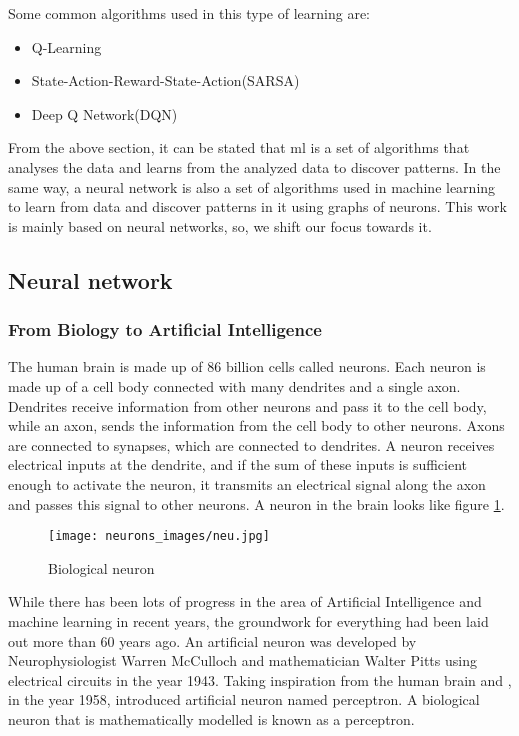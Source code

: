 \par

Some common algorithms used in this type of learning are: 

\begin{itemize}
        \item Q-Learning
        \item State-Action-Reward-State-Action(SARSA)
        \item Deep Q Network(DQN)
\end{itemize}


From the above section, it can be stated that \ac{ml} is a set of algorithms that analyses the data and learns from the analyzed data to discover patterns. In the same way, a neural network is also a set of algorithms used in machine learning to learn from data and discover patterns in it using graphs of neurons. This work is mainly based on neural networks, so,  we shift our focus towards it. 

\subsection{Neural network} \label{Neural Networks}

\subsubsection{From Biology to Artificial Intelligence}

The human brain is made up of 86 billion cells called neurons. Each neuron is made up of a cell body connected with many dendrites and a single axon. Dendrites receive information from other neurons and pass it to the cell body, while an axon, sends the information from the cell body to other neurons. Axons are connected to synapses, which are connected to dendrites. A neuron receives electrical inputs at the dendrite, and if the sum of these inputs is sufficient enough to activate the neuron, it transmits an electrical signal along the axon and passes this signal to other neurons. A neuron in the brain looks like figure \ref{biological_neuron}.  

\begin{figure}[h!]
    \centering
    \texttt{[image: neurons\_images/neu.jpg]}
    \caption{Biological neuron \cite{cs231}}
    \label{biological_neuron}
\end{figure}

\newpage

While there has been lots of progress in the area of Artificial Intelligence and machine learning in recent years, the groundwork for everything had been laid out more than 60 years ago. An artificial neuron was developed by Neurophysiologist Warren McCulloch and mathematician Walter Pitts using electrical circuits in the year 1943. Taking inspiration from the human brain and \cite{mcculloch1943logical}, in the year 1958, \cite{rosenblatt1960perceptron} introduced artificial neuron named perceptron. A biological neuron that is mathematically modelled is known as a perceptron.

